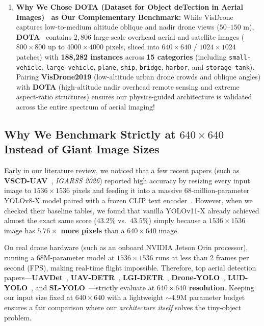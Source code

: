 \documentclass[11pt,a4paper]{article}
\begin{document}
\begin{enumerate}[leftmargin=1.6em]
    \item \textbf{Why We Chose DOTA (Dataset for Object deTection in Aerial Images)~\cite{xia2018dota,ding2021dota} as Our Complementary Benchmark:}
    While VisDrone captures low-to-medium altitude oblique and nadir drone views ($50\text{--}150\text{ m}$), \textbf{DOTA}~\cite{xia2018dota,ding2021dota} contains $2,806$ large-scale overhead aerial and satellite images ($800\times 800$ up to $4000\times 4000$ pixels, sliced into $640\times 640$ / $1024\times 1024$ patches) with \textbf{188,282 instances} across \textbf{15 categories} (including \texttt{small-vehicle}, \texttt{large-vehicle}, \texttt{plane}, \texttt{ship}, \texttt{bridge}, \texttt{harbor}, and \texttt{storage-tank}). Pairing \textbf{VisDrone2019} (low-altitude urban drone crowds and oblique angles) with \textbf{DOTA} (high-altitude nadir overhead remote sensing and extreme aspect-ratio structures) ensures our physics-guided architecture is validated across the entire spectrum of aerial imaging!
\end{enumerate}

\subsection{Why We Benchmark Strictly at $640\times 640$ Instead of Giant Image Sizes}
Early in our literature review, we noticed that a few recent papers (such as \textbf{VSCD-UAV}~\cite{yang2026vscduav}, \emph{IGARSS 2026}) reported high accuracy by resizing every input image to $1536\times 1536$ pixels and feeding it into a massive 68-million-parameter YOLOv8-X model paired with a frozen CLIP text encoder~\cite{radford2021clip}. However, when we checked their baseline tables, we found that vanilla YOLOv11-X already achieved almost the exact same score ($43.2\%$ vs.\ $43.5\%$) simply because a $1536\times 1536$ image has \textbf{$5.76\times$ more pixels} than a $640\times 640$ image.

On real drone hardware (such as an onboard NVIDIA Jetson Orin processor), running a 68M-parameter model at $1536\times 1536$ runs at less than 2 frames per second (FPS), making real-time flight impossible. Therefore, top aerial detection papers---\textbf{UAVDet}~\cite{yang2026uavdet}, \textbf{UAV-DETR}~\cite{zhang2025uavdetr}, \textbf{LGI-DETR}~\cite{chen2025lgidetr}, \textbf{Drone-YOLO}~\cite{zhang2023droneyolo}, \textbf{LUD-YOLO}~\cite{li2026ludyolo}, and \textbf{SL-YOLO}~\cite{chen2025slyolo}---strictly evaluate at \textbf{$640\times 640$ resolution}. Keeping our input size fixed at $640\times 640$ with a lightweight $\sim 4.9\text{M}$ parameter budget ensures a fair comparison where our \emph{architecture itself} solves the tiny-object problem.
\end{document}
